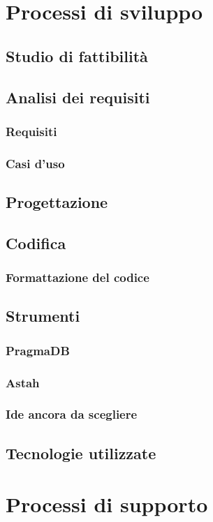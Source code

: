 \section{Processi di sviluppo}
	\subsection{Studio di fattibilità}
	\subsection{Analisi dei requisiti}
		\subsubsection{Requisiti}
		\subsubsection{Casi d'uso}
	\subsection{Progettazione}
	\subsection{Codifica}
		\subsubsection{Formattazione del codice}
	\subsection{Strumenti}
		\subsubsection{PragmaDB}
		\subsubsection{Astah}
		\subsubsection{Ide ancora da scegliere}
	\subsection{Tecnologie utilizzate}
\section{Processi di supporto}

